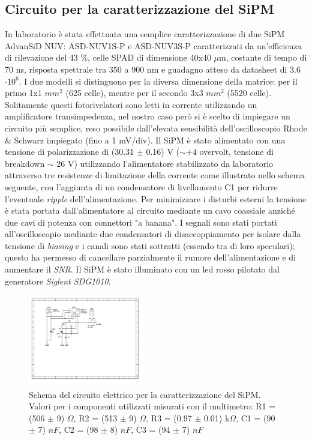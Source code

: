 \documentclass[journal]{IEEEtran}
\begin{document}
\subsection{\textbf{Circuito per la caratterizzazione del SiPM}}
In laboratorio è stata effettuata una semplice caratterizzazione di due SiPM AdvanSiD NUV: ASD-NUV1S-P e ASD-NUV3S-P \cite{I} caratterizzati da un'efficienza di rilevazione del 43 \%, celle SPAD di dimensione 40x40 $\mu$m, costante di tempo di 70 ns, risposta spettrale tra 350 a 900 nm e guadagno atteso da datasheet di 3.6 $\cdot 10^6$. I due modelli si distinguono per la diversa dimensione della matrice: per il primo 1x1 $mm^2$ (625 celle), mentre per il secondo 3x3 $mm^2$ (5520 celle). Solitamente questi fotorivelatori sono letti in corrente utilizzando un amplificatore transimpedenza, nel nostro caso però si è scelto di impiegare un circuito più semplice, reso possibile dall'elevata sensibilità dell'oscilloscopio Rhode \& Schwarz impiegato (fino a 1 mV/div). Il SiPM è stato alimentato con una tensione di polarizzazione di (30.31 $\pm$ 0.16) V ($\sim +4$ overvolt, tensione di breakdown $\sim$ 26 V) utilizzando l'alimentatore stabilizzato da laboratorio attraverso tre resistenze di limitazione della corrente come illustrato nello schema seguente, con l'aggiunta di un condensatore di livellamento C1 per ridurre l'eventuale \textit{ripple} dell'alimentazione. Per minimizzare i disturbi esterni la tensione è stata portata dall'alimentatore al circuito mediante un cavo coassiale anziché due cavi di potenza con connettori "a banana". I segnali sono stati portati all'oscilloscopio mediante due condensatori di disaccoppiamento per isolare dalla tensione di \textit{biasing} e i canali sono stati sottratti (essendo tra di loro speculari); questo ha permesso di cancellare parzialmente il rumore dell'alimentazione e di aumentare il \textit{SNR}. Il SiPM è stato illuminato con un led rosso pilotato dal generatore \textit{Siglent SDG1010}.

\begin{figure}[H]%
\begin{center}
\includegraphics[width=0.46\textwidth]{sch-simulations/output/SiPM.pdf}
\caption{Schema del circuito elettrico per la caratterizzazione del SiPM. Valori per i componenti utilizzati misurati con il multimetro: R1 = (506 $\pm$ 9) $\Omega$, R2 = (513 $\pm$ 9) $\Omega$, R3 = (0.97 $\pm$ 0.01) k$\Omega$, C1 = (90 $\pm$ 7) $nF$, C2 = (98 $\pm$ 8) $nF$, C3 = (94 $\pm$ 7) $nF$}
\label{fig:oscilloscope}
\end{center}
\end{figure}
\end{document}
